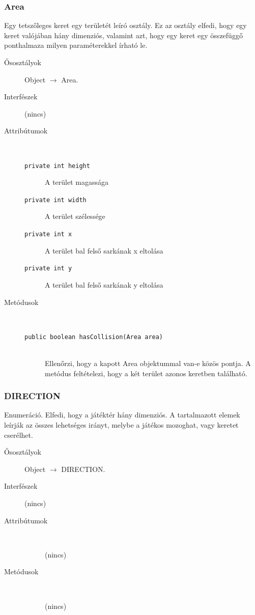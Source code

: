 		\subsubsection{Area}
				 Egy tetszőleges keret egy területét leíró osztály.  Ez az osztály elfedi, hogy egy keret valójában hány dimenziós,  valamint azt, hogy egy keret egy összefüggő ponthalmaza milyen   paraméterekkel írható le. 			\begin{description}


				\item[Ősosztályok] Object $\rightarrow{}$ Area.
				\item[Interfészek] (nincs)
				\item[Attribútumok]$\ $
					\begin{description}
						\item[\texttt{private int height}] A terület magassága 
						\item[\texttt{private int width}] A terület szélessége 
						\item[\texttt{private int x}] A terület bal felső sarkának x eltolása 
						\item[\texttt{private int y}] A terület bal felső sarkának y eltolása 
					\end{description}
				\item[Metódusok]$\ $
					\begin{description}
						\item[\texttt{public boolean hasCollision(Area area)}] \hfill \\ Ellenőrzi, hogy a kapott Area objektummal van-e közös pontja.  A metódus feltételezi, hogy a két terület azonos keretben található. 
					\end{description}
			\end{description}

		\subsubsection{DIRECTION}
				 Enumeráció. Elfedi, hogy a játéktér hány dimenziós.  A tartalmazott elemek leírják az összes lehetséges irányt,   melybe a játékos mozoghat, vagy keretet cserélhet.  			\begin{description}


				\item[Ősosztályok] Object $\rightarrow{}$ DIRECTION.
				\item[Interfészek] (nincs)
				\item[Attribútumok]$\ $
					\begin{description}
						\item[] (nincs)
					\end{description}
				\item[Metódusok]$\ $
					\begin{description}
						\item[] (nincs)
					\end{description}
			\end{description}

